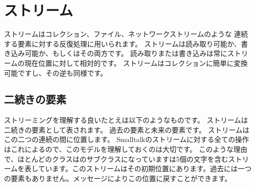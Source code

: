 \documentclass[a4paper,10pt,twoside]{book}
\begin{document}
	\renewcommand{\nnbb}[2]{} %
	\sloppy
\fi
\chapter{ストリーム}



ストリームはコレクション、ファイル、ネットワークストリームのような
連続する要素に対する反復処理に用いられます。
ストリームは読み取り可能か、書き込み可能か、もしくはその両方です。
読み取りまたは書き込みは常にストリームの現在位置に対して相対的です。
ストリームはコレクションに簡単に変換可能ですし、その逆も同様です。



\section{二続きの要素}

ストリーミングを理解する良いたとえは以下のようなものです。
ストリームは二続きの要素として表されます。
過去の要素と未来の要素です。
ストリームはこの二つの連続の間に位置します。
Smalltalkのストリームに対する全ての操作はこれによるので、このモデルを理解しておくのは大切です。
このような理由で、ほとんどのクラスはのサブクラスになっていますは5個の文字を含むストリームを表しています。このストリームはその初期位置にあります。\ie 過去には一つの要素もありません。メッセージによりこの位置に戻すことができます。
\end{document}
